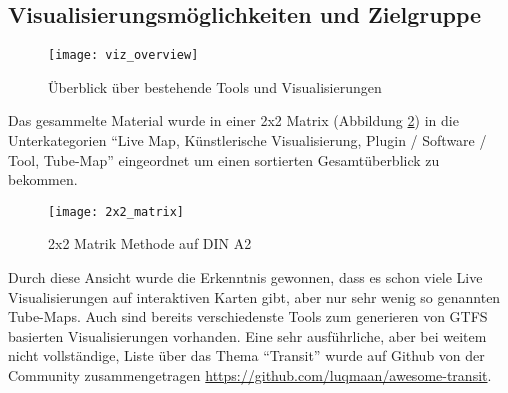\subsection{Visualisierungsmöglichkeiten und Zielgruppe}
\label{sub:visualisierungsmöglichkeiten_und_zielgruppe}
  \begin{figure}[ht]
    \begin{center}
      \texttt{[image: viz\_overview]}
      \caption{Überblick über bestehende Tools und Visualisierungen}
      \label{fig:viz_overview}
    \end{center}
  \end{figure}

  Das gesammelte Material wurde in einer 2x2 Matrix (Abbildung \ref{fig:2x2_matrix}) in die Unterkategorien "`Live Map, Künstlerische Visualisierung, Plugin / Software / Tool, Tube-Map"' eingeordnet um einen sortierten Gesamtüberblick zu bekommen. 

  \begin{figure}[htbp]
    \begin{center}
      \texttt{[image: 2x2\_matrix]}
      \caption{2x2 Matrik Methode auf DIN A2}
      \label{fig:2x2_matrix}
    \end{center}
  \end{figure}

  Durch diese Ansicht wurde die Erkenntnis gewonnen, dass es schon viele Live Visualisierungen auf interaktiven Karten gibt, aber nur sehr wenig so genannten Tube-Maps. Auch sind bereits verschiedenste Tools zum generieren von GTFS basierten Visualisierungen vorhanden. Eine sehr ausführliche, aber bei weitem nicht vollständige, Liste über das Thema "`Transit"' wurde auf Github von der Community zusammengetragen \url{https://github.com/luqmaan/awesome-transit}.
